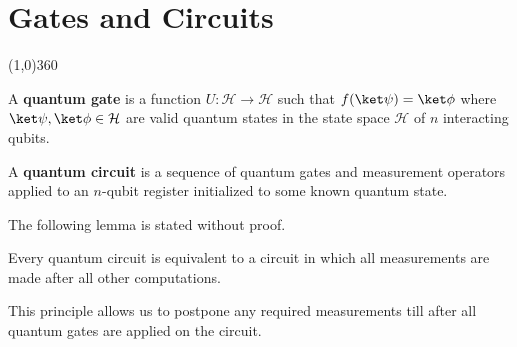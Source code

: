 \chapter{Gates and Circuits}
\line(1,0){360} \\

\begin{comment}
     x Definitition of quantum gates
     x reversible defn
     x quantum circuit definition
     x deferred measurement principle
     x Representation of a quantum gate in dirac notation
     x gate which takes \ket\psi to \ket\phi
     x ket bra notation and how it describes a transformation
     x any reversible classical gate has a valid quantum analog
     * Single Qubit Gates
     * Eigen values and Eigenvectors of Hadamard Gate
     * Multiple Qubit Gates
     * Quantum Gates applied to one qubit in an $n$-qubit register
\end{comment}


\begin{defn}
    A \textbf{quantum gate} is a function $U: \mathcal{H} \to \mathcal{H}$ such that $f(\ket\psi) = \ket\phi$ where $\ket\psi, \ket\phi \in \mathcal{H}$ are valid quantum states in the state space $\mathcal{H}$ of $n$ interacting qubits.
\end{defn}

\begin{defn}
    A \textbf{quantum circuit} is a sequence of quantum gates and measurement operators applied to an $n$-qubit register initialized to some known quantum state.
\end{defn}

The following lemma is stated without proof. 

\begin{lemma}
    Every quantum circuit is equivalent to a circuit in which all measurements are made after all other computations.
\end{lemma}

This principle allows us to postpone any required measurements till after all quantum gates are applied on the circuit.

